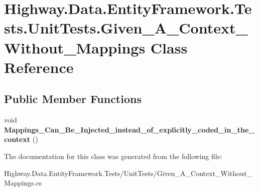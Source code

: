 \hypertarget{class_highway_1_1_data_1_1_entity_framework_1_1_tests_1_1_unit_tests_1_1_given___a___context___without___mappings}{\section{Highway.\-Data.\-Entity\-Framework.\-Tests.\-Unit\-Tests.\-Given\-\_\-\-A\-\_\-\-Context\-\_\-\-Without\-\_\-\-Mappings Class Reference}
\label{class_highway_1_1_data_1_1_entity_framework_1_1_tests_1_1_unit_tests_1_1_given___a___context___without___mappings}
}
\subsection*{Public Member Functions}
\begin{DoxyCompactItemize}
\item 
\hypertarget{class_highway_1_1_data_1_1_entity_framework_1_1_tests_1_1_unit_tests_1_1_given___a___context___without___mappings_a5760ba8525f9e8e548e10c3fcd472006}{void {\bfseries Mappings\-\_\-\-Can\-\_\-\-Be\-\_\-\-Injected\-\_\-instead\-\_\-of\-\_\-explicitly\-\_\-coded\-\_\-in\-\_\-the\-\_\-context} ()}\label{class_highway_1_1_data_1_1_entity_framework_1_1_tests_1_1_unit_tests_1_1_given___a___context___without___mappings_a5760ba8525f9e8e548e10c3fcd472006}

\end{DoxyCompactItemize}


The documentation for this class was generated from the following file\-:\begin{DoxyCompactItemize}
\item 
Highway.\-Data.\-Entity\-Framework.\-Tests/\-Unit\-Tests/Given\-\_\-\-A\-\_\-\-Context\-\_\-\-Without\-\_\-\-Mappings.\-cs\end{DoxyCompactItemize}

